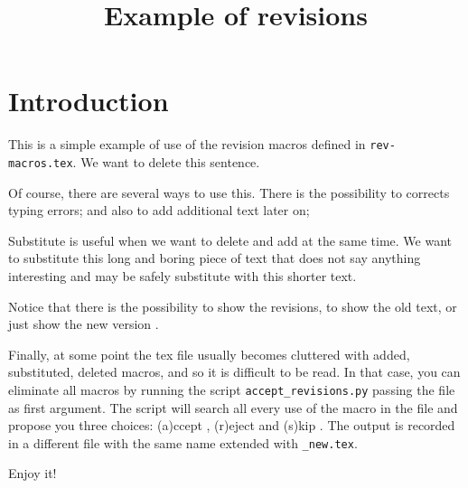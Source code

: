 \documentclass{article}
\title{Example of revisions}
\begin{document}
\maketitle

\section{Introduction}

This is a simple example of use of the revision
macros defined in \texttt{rev-macros.tex}. We want to delete this sentence.

Of course, there are several ways to use this. There is the
possibility to corrects typing errors; and also to add
additional text later on; 

Substitute is useful when we want to delete and add at the same
time. We want to substitute this long and boring piece of
  text that does not say anything interesting and may be safely
  substitute with this shorter text.

Notice that there is the possibility to show the revisions,  to show the
old text,  or just show the new
version .

Finally, at some point the tex file usually becomes cluttered with
added, substituted, deleted macros, and so it is difficult to be
read. In that case, you can eliminate all macros by running the
 script \texttt{accept\_revisions.py} passing the file
as first argument. The script will search all every use of the macro
in the file and propose you three choices: (a)ccept , (r)eject  and (s)kip
. The output is recorded in a
different file with the same name extended with \texttt{\_new.tex}.

Enjoy it! 
\end{document}
